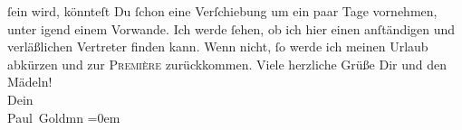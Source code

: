 \begin{ledgroupsized}[t]{13cm}
               ſein wird, könnteſt Du ſchon eine Verſchiebung um ein paar Tage vornehmen, unter
               igend einem Vorwande. Ich werde ſehen, ob ich hier einen anſtändigen und verläßlichen
                  {\pb}Vertreter finden kann. Wenn nicht, ſo werde ich
               meinen Urlaub abkürzen und zur \textsc{Première} zurückkommen.\pend
           \pstart
           Viele herzliche Grüße Dir und den Mädeln! {\\[\baselineskip]}Dein {\\[\baselineskip]}\spacefill\mbox{Paul Goldmn}\pend
           \leftskip=0em{}
         
         \endnumbering{}\end{ledgroupsized}  \newcommand{\dateiname}{L03095}\newcommand{\titel}{Paul Goldmann an Arthur Schnitzler, 13. 12. [1901]}\newcommand{\editorInnen}{Martin Anton Müller und Laura Untner}
      